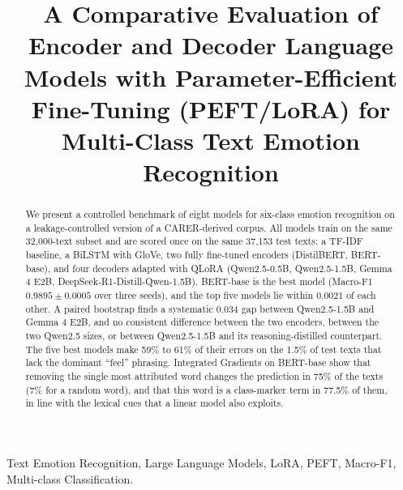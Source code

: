 \documentclass[conference]{IEEEtran}
\begin{document}
\title{A Comparative Evaluation of Encoder and Decoder Language Models with Parameter-Efficient Fine-Tuning (PEFT/LoRA)
for Multi-Class Text Emotion Recognition
}

\author{
\and
{}
\and
{}
}

\maketitle

\begin{abstract}
We present a controlled benchmark of eight models for six-class emotion recognition on a leakage-controlled version of a CARER-derived corpus. All models train on the same 32,000-text subset and are scored once on the same 37,153 test texts: a TF-IDF baseline, a BiLSTM with GloVe, two fully fine-tuned encoders (DistilBERT, BERT-base), and four decoders adapted with QLoRA (Qwen2.5-0.5B, Qwen2.5-1.5B, Gemma 4 E2B, DeepSeek-R1-Distill-Qwen-1.5B). BERT-base is the best model (Macro-F1 $0.9895 \pm 0.0005$ over three seeds), and the top five models lie within $0.0021$ of each other. A paired bootstrap finds a systematic $0.034$ gap between Qwen2.5-1.5B and Gemma 4 E2B, and no consistent difference between the two encoders, between the two Qwen2.5 sizes, or between Qwen2.5-1.5B and its reasoning-distilled counterpart. The five best models make 59\% to 61\% of their errors on the 1.5\% of test texts that lack the dominant ``feel'' phrasing. Integrated Gradients on BERT-base show that removing the single most attributed word changes the prediction in 75\% of the texts (7\% for a random word), and that this word is a class-marker term in 77.5\% of them, in line with the lexical cues that a linear model also exploits.
\end{abstract}

\begin{IEEEkeywords}
Text Emotion Recognition, Large Language Models, LoRA, PEFT, Macro-F1, Multi-class Classification.
\end{IEEEkeywords}





\end{document}
